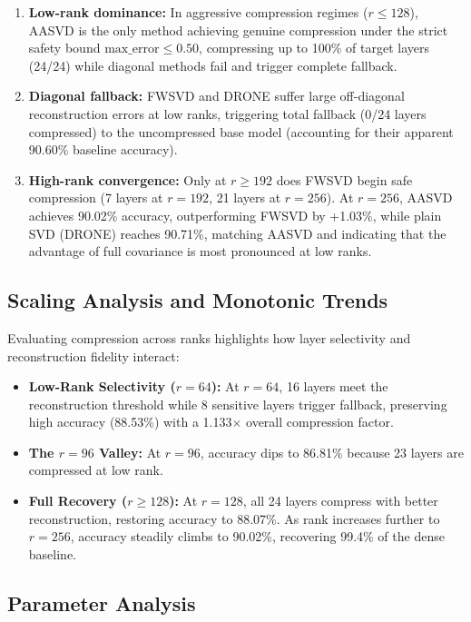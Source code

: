 \begin{enumerate}
\item \textbf{Low-rank dominance:} In aggressive compression regimes ($r \le 128$), AASVD is the only method achieving genuine compression under the strict safety bound $\text{max\_error} \le 0.50$, compressing up to 100\% of target layers (24/24) while diagonal methods fail and trigger complete fallback.
\item \textbf{Diagonal fallback:} FWSVD and DRONE suffer large off-diagonal reconstruction errors at low ranks, triggering total fallback (0/24 layers compressed) to the uncompressed base model (accounting for their apparent 90.60\% baseline accuracy).
\item \textbf{High-rank convergence:} Only at $r \ge 192$ does FWSVD begin safe compression (7 layers at $r=192$, 21 layers at $r=256$). At $r=256$, AASVD achieves 90.02\% accuracy, outperforming FWSVD by +1.03\%, while plain SVD (DRONE) reaches 90.71\%, matching AASVD and indicating that the advantage of full covariance is most pronounced at low ranks.
\end{enumerate}

\subsection{Scaling Analysis and Monotonic Trends}

Evaluating compression across ranks highlights how layer selectivity and reconstruction fidelity interact:
\begin{itemize}
\item \textbf{Low-Rank Selectivity ($r=64$):} At $r=64$, 16 layers meet the reconstruction threshold while 8 sensitive layers trigger fallback, preserving high accuracy (88.53\%) with a 1.133$\times$ overall compression factor.
\item \textbf{The $r=96$ Valley:} At $r=96$, accuracy dips to 86.81\% because 23 layers are compressed at low rank.
\item \textbf{Full Recovery ($r \ge 128$):} At $r=128$, all 24 layers compress with better reconstruction, restoring accuracy to 88.07\%. As rank increases further to $r=256$, accuracy steadily climbs to 90.02\%, recovering 99.4\% of the dense baseline.
\end{itemize}

\subsection{Parameter Analysis}

